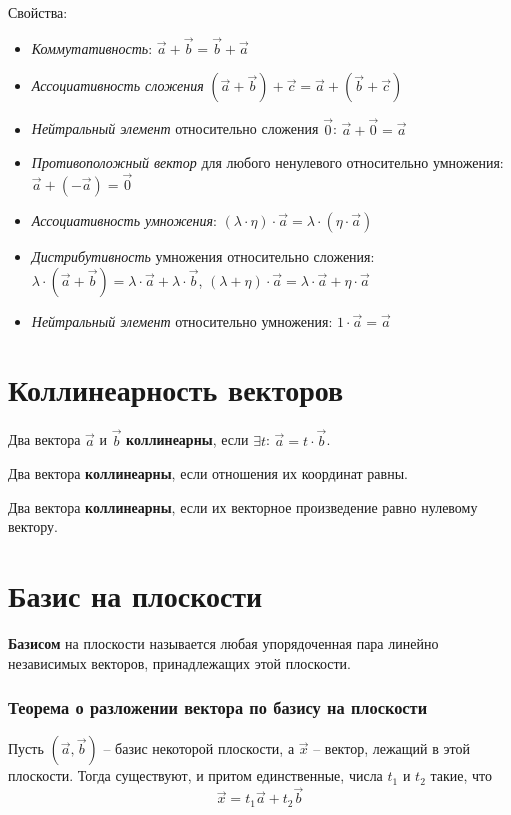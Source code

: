 \documentclass[a4paper]{article}
\begin{document}
Свойства:
\begin{itemize}
\item \textit{Коммутативность}: $\vec{a} + \vec{b} = \vec{b} + \vec{a}$
\item \textit{Ассоциативность сложения} $(\vec{a} + \vec{b}) + \vec{c} = \vec{a} + (\vec{b}+\vec{c})$
\item \textit{Нейтральный элемент} относительно сложения $\vec{0}$: $\vec{a} + \vec{0} = \vec{a}$
\item \textit{Противоположный вектор} для любого ненулевого относительно умножения: $\vec{a}+(-\vec{a}) = \vec{0}$
\item \textit{Ассоциативность умножения}: $(\lambda \cdot \eta) \cdot \vec{a} = \lambda \cdot ( \eta \cdot \vec{a})$
\item \textit{Дистрибутивность} умножения относительно сложения: $\lambda \cdot (\vec{a} + \vec{b}) = \lambda \cdot \vec{a} + \lambda \cdot \vec{b}$, $(\lambda + \eta) \cdot \vec{a} = \lambda \cdot \vec{a} + \eta \cdot \vec{a}$
\item \textit{Нейтральный элемент} относительно умножения: $1 \cdot \vec{a} = \vec{a}$
\end{itemize}
\section*{Коллинеарность векторов}
Два вектора $\vec{a}$ и $\vec{b}$ \textbf{коллинеарны}, если $\exists t$: $\vec{a} = t \cdot \vec{b}$.

Два вектора \textbf{коллинеарны}, если отношения их координат равны.

Два вектора \textbf{коллинеарны}, если их векторное произведение равно нулевому вектору.

\section*{Базис на плоскости}
\textbf{Базисом} на плоскости называется любая упорядоченная пара линейно независимых векторов, принадлежащих этой плоскости. 

\subsubsection*{Теорема о разложении вектора по базису на плоскости}

Пусть $(\vec{a},\vec{b})$ – базис некоторой плоскости, а $\vec{x}$ – вектор, лежащий в этой
плоскости. Тогда существуют, и притом единственные, числа $t_1$ и $t_2$ такие,
что
\begin{equation}
\vec{x} = t_1 \vec{a} + t_2 \vec{b}
\end{equation}
\end{document}
